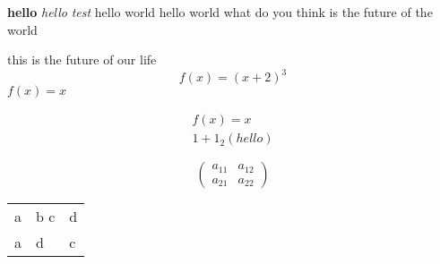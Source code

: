 \documentclass{article}
\begin{document}








\textbf{hello}
\textit{hello}
\emph{test}
hello world
hello world
what do you think is the future of the world

this is the future of our life
\[f(x) = (x+2) ^3 \]
\(f(x) = x\)

\begin{align}
    f(x) = x \\
    1 + 1_2
    \left( hello \right)
\end{align}

\[
\begin{pmatrix}
    a_{11} & a_{12} \\
    a_{21} & a_{22}
\end{pmatrix}
\]

\begin{tabular}{lll}
    a & b c & d\\ 
    a & d & c
    
\end{tabular}
\end{document}

